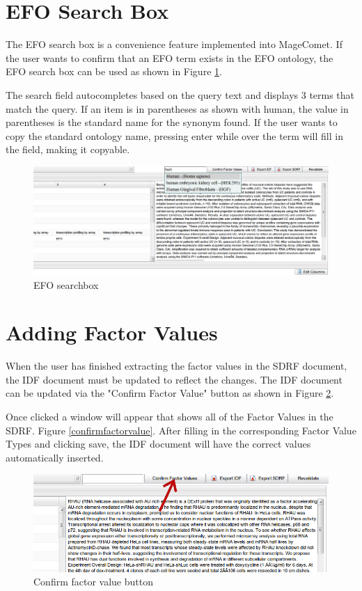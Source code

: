 \documentclass[a4paper]{article}
\begin{document}
\newpage
\section{EFO Search Box}
The EFO search box is a convenience feature implemented into MageComet. If the user wants to confirm that an EFO term exists in the EFO ontology, the EFO search box can be used as shown in Figure \ref{searchbox}.

The search field autocompletes based on the query text and displays 3 terms that match the query. If an item is in parentheses as shown with human, the value in parentheses is the standard name for the synonym found. If the user wants to copy the standard ontology name, pressing enter while over the term will fill in the field, making it copyable.

\begin{figure}[h]
\caption{EFO searchbox}
\centering
\label{searchbox}
\includegraphics[width=17cm]{images/searchbox}
\end{figure}



\section{Adding Factor Values}
When the user has finished extracting the factor values in the SDRF document, the IDF document must be updated to reflect the changes. The IDF document can be updated via the "Confirm Factor Value" button as shown in Figure \ref{confirmfactorbutton}.

Once clicked a window will appear that shows all of the Factor Values in the SDRF. Figure \ref{confirmfactorvalue}. After filling in the corresponding Factor Value Types and clicking save, the IDF document will have the correct values automatically inserted.




\begin{figure}[h]
\caption{Confirm factor value button}
\centering
\label{confirmfactorbutton}
\includegraphics[width=17cm]{images/confirmfactorbutton}
\end{figure}
\end{document}
